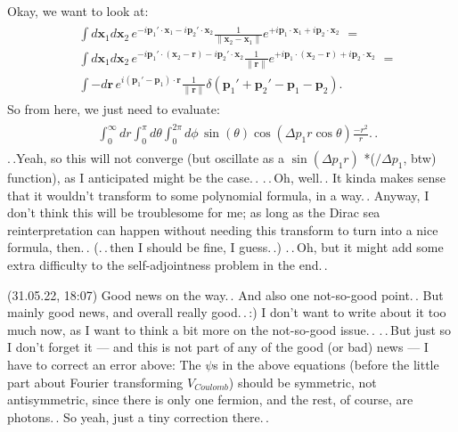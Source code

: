 \documentclass{report}
\begin{document}
Okay, we want to look at:
\begin{align}
\begin{aligned}
	&\,\int d\mathbf{x}_1 d\mathbf{x}_2\, 
		e^{-i \mathbf{p}_1' \cdot \mathbf{x}_1 - i \mathbf{p}_2' \cdot \mathbf{x}_2 }
		\frac{1}{\| \mathbf{x}_2 - \mathbf{x}_1 \|}
		e^{+i \mathbf{p}_1 \cdot \mathbf{x}_1 + i \mathbf{p}_2 \cdot \mathbf{x}_2 }
	\,\,=\\
	&\,\int d\mathbf{x}_1 d\mathbf{x}_2\, 
		e^{-i \mathbf{p}_1' \cdot (\mathbf{x}_2 - \mathbf{r}) - i \mathbf{p}_2' \cdot \mathbf{x}_2 }
		\frac{1}{\| \mathbf{r} \|}
		e^{+i \mathbf{p}_1 \cdot (\mathbf{x}_2 - \mathbf{r}) + i \mathbf{p}_2 \cdot \mathbf{x}_2 }
	\,\,=\\
	&\,\int - d\mathbf{r}\, 
		e^{i (\mathbf{p}_1' - \mathbf{p}_1) \cdot \mathbf{r}}
		\frac{1}{\| \mathbf{r} \|}
		\delta(\mathbf{p}_1' + \mathbf{p}_2' - \mathbf{p}_1 - \mathbf{p}_2).
\end{aligned}
\end{align}
So from here, we just need to evaluate: %
\begin{align}
\begin{aligned}
	&\,\int_0^{\infty} dr \int_{0}^{\pi} d\theta \int_{0}^{2\pi} d\phi\,
		\sin(\theta) \cos(\Delta p_1 r \cos \theta )
		\frac{-r^2}{r}.\,. %
\end{aligned}
\end{align}
.\,.Yeah, so this will not converge (but oscillate as a $\sin(\Delta p_1 r)$ *($/\Delta p_1$, btw) function), as I anticipated might be the case.\,. .\,.\,Oh, well.\,. It kinda makes sense that it wouldn't transform to some polynomial formula, in a way.\,. Anyway, I don't think this will be troublesome for me; as long as the Dirac sea reinterpretation can happen without needing this transform to turn into a nice formula, then.\,. (.\,.\,then I should be fine, I guess.\,.) %
.\,.\,Oh, but it might add some extra difficulty to the self-adjointness problem in the end.\,. 


(31.05.22, 18:07) Good news on the way.\,. And also one not-so-good point.\,. But mainly good news, and overall really good.\,.\,:) I don't want to write about it too much now, as I want to think a bit more on the not-so-good issue.\,. .\,.\,But just so I don't forget it --- and this is not part of any of the good (or bad) news --- I have to correct an error above: The $\psi$s in the above equations (before the little part about Fourier transforming $V_{Coulomb}$) should be symmetric, not antisymmetric, since there is only one fermion, and the rest, of course, are photons.\,. So yeah, just a tiny correction there.\,. 
\end{document}
